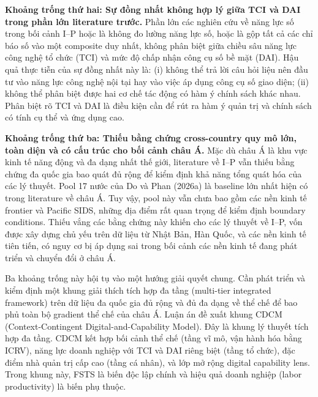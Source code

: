 \documentclass[12pt,a4paper]{article}
\begin{document}
\textbf{Khoảng trống thứ hai: Sự đồng nhất không hợp lý giữa TCI và DAI
trong phần lớn literature trước.} Phần lớn các nghiên cứu về năng lực số
trong bối cảnh I--P hoặc là không đo lường năng lực số, hoặc là gộp tất
cả các chỉ báo số vào một composite duy nhất, không phân biệt giữa chiều
sâu năng lực công nghệ tổ chức (TCI) và mức độ chấp nhận công cụ số bề
mặt (DAI). Hậu quả thực tiễn của sự đồng nhất này là: (i) không thể trả
lời câu hỏi liệu nên đầu tư vào năng lực công nghệ nội tại hay vào việc
áp dụng công cụ số giao diện; (ii) không thể phân biệt được hai cơ chế
tác động có hàm ý chính sách khác nhau. Phân biệt rõ TCI và DAI là điều
kiện cần để rút ra hàm ý quản trị và chính sách có tính cụ thể và ứng
dụng cao.

\textbf{Khoảng trống thứ ba: Thiếu bằng chứng cross-country quy mô lớn,
toàn diện và có cấu trúc cho bối cảnh châu Á.} Mặc dù châu Á là khu vực
kinh tế năng động và đa dạng nhất thế giới, literature về I--P vẫn thiếu
bằng chứng đa quốc gia bao quát đủ rộng để kiểm định khả năng tổng quát
hóa của các lý thuyết. Pool 17 nước của Do và Phan (2026a) là baseline
lớn nhất hiện có trong literature về châu Á. Tuy vậy, pool này vẫn chưa
bao gồm các nền kinh tế frontier và Pacific SIDS, những địa điểm rất
quan trọng để kiểm định boundary conditions. Thiếu vắng các bằng chứng
này khiến cho các lý thuyết về I--P, vốn được xây dựng chủ yếu trên dữ
liệu từ Nhật Bản, Hàn Quốc, và các nền kinh tế tiên tiến, có nguy cơ bị
áp dụng sai trong bối cảnh các nền kinh tế đang phát triển và chuyển đổi
ở châu Á.

Ba khoảng trống này hội tụ vào một hướng giải quyết chung. Cần phát
triển và kiểm định một khung giải thích tích hợp đa tầng (multi-tier
integrated framework) trên dữ liệu đa quốc gia đủ rộng và đủ đa dạng về
thể chế để bao phủ toàn bộ gradient thể chế của châu Á. Luận án đề xuất
khung CDCM (Context-Contingent Digital-and-Capability Model). Đây là
khung lý thuyết tích hợp đa tầng. CDCM kết hợp bối cảnh thể chế (tầng vĩ
mô, vận hành hóa bằng ICRV), năng lực doanh nghiệp với TCI và DAI riêng
biệt (tầng tổ chức), đặc điểm nhà quản trị cấp cao (tầng cá nhân), và
lớp mở rộng digital capability lens. Trong khung này, FSTS là biến độc
lập chính và hiệu quả doanh nghiệp (labor productivity) là biến phụ
thuộc.
\end{document}
